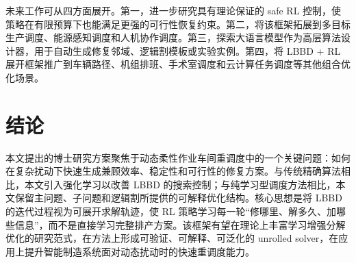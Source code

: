 \documentclass[UTF8,12pt,a4paper]{ctexart}
\begin{document}
未来工作可从四方面展开。第一，进一步研究具有理论保证的 safe RL 控制，使策略在有限预算下也能满足更强的可行性恢复约束。第二，将该框架拓展到多目标生产调度、能源感知调度和人机协作调度。第三，探索大语言模型作为高层算法设计器，用于自动生成修复邻域、逻辑割模板或实验实例。第四，将 LBBD + RL 展开框架推广到车辆路径、机组排班、手术室调度和云计算任务调度等其他组合优化场景。

\section{结论}

本文提出的博士研究方案聚焦于动态柔性作业车间重调度中的一个关键问题：如何在复杂扰动下快速生成兼顾效率、稳定性和可行性的修复方案。与传统精确算法相比，本文引入强化学习以改善 LBBD 的搜索控制；与纯学习型调度方法相比，本文保留主问题、子问题和逻辑割所提供的可解释优化结构。核心思想是将 LBBD 的迭代过程视为可展开求解轨迹，使 RL 策略学习每一轮“修哪里、解多久、加哪些信息”，而不是直接学习完整排产方案。该框架有望在理论上丰富学习增强分解优化的研究范式，在方法上形成可验证、可解释、可泛化的 unrolled solver，在应用上提升智能制造系统面对动态扰动时的快速重调度能力。
\end{document}
